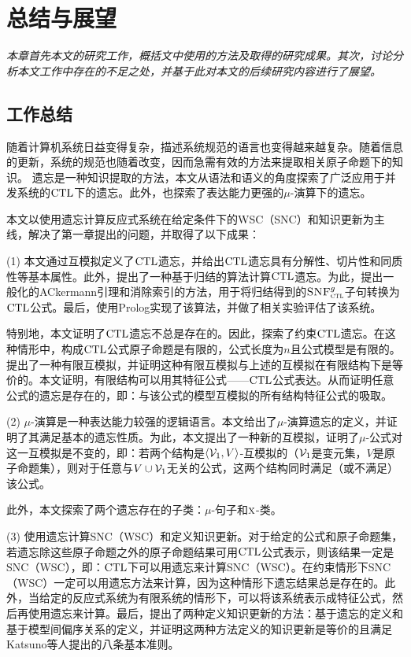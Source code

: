 \chapter{总结与展望}\label{chapter09}
{\em 本章首先本文的研究工作，概括文中使用的方法及取得的研究成果。其次，讨论分析本文工作中存在的不足之处，并基于此对本文的后续研究内容进行了展望。}

\section{工作总结}
随着计算机系统日益变得复杂，描述系统规范的语言也变得越来越复杂。随着信息的更新，系统的规范也随着改变，因而急需有效的方法来提取相关原子命题下的知识。
遗忘是一种知识提取的方法，本文从语法和语义的角度探索了广泛应用于并发系统的$\textrm{CTL}$下的遗忘。此外，也探索了表达能力更强的$\mu$-演算下的遗忘。

本文以使用遗忘计算反应式系统在给定条件下的WSC（SNC）和知识更新为主线，解决了第一章提出的问题，并取得了以下成果：

(1) 本文通过互模拟定义了$\textrm{CTL}$遗忘，并给出$\textrm{CTL}$遗忘具有分解性、切片性和同质性等基本属性。此外，提出了一种基于归结的算法计算$\textrm{CTL}$遗忘。为此，提出一般化的ACkermann引理和消除索引的方法，用于将归结得到的${\textsc{SNF}_{\textsc{ctl}}^g}$子句转换为$\textrm{CTL}$公式。最后，使用Prolog实现了该算法，并做了相关实验评估了该系统。

特别地，本文证明了$\textrm{CTL}$遗忘不总是存在的。因此，探索了约束$\textrm{CTL}$遗忘。在这种情形中，构成$\textrm{CTL}$公式原子命题是有限的，公式长度为$n$且公式模型是有限的。提出了一种有限互模拟，并证明这种有限互模拟与上述的互模拟在有限结构下是等价的。本文证明，有限结构可以用其特征公式——$\textrm{CTL}$公式表达。从而证明任意公式的遗忘是存在的，即：与该公式的模型互模拟的所有结构特征公式的吸取。

(2) $\mu$-演算是一种表达能力较强的逻辑语言。本文给出了$\mu$-演算遗忘的定义，并证明了其满足基本的遗忘性质。为此，本文提出了一种新的互模拟，证明了$\mu$-公式对这一互模拟是不变的，即：若两个结构是${\langle{{\cal V}_1, V}\rangle}$-互模拟的（${\cal V}_1$是变元集，$V$是原子命题集），则对于任意与$V\cup {\cal V}_1$无关的公式，这两个结构同时满足（或不满足）该公式。

此外，本文探索了两个遗忘存在的子类：$\mu$-句子和$\textsc{x}$-类。

(3) 使用遗忘计算SNC（WSC）和定义知识更新。对于给定的公式和原子命题集，若遗忘除这些原子命题之外的原子命题结果可用$\textrm{CTL}$公式表示，则该结果一定是SNC（WSC），即：$\textrm{CTL}$下可以用遗忘来计算SNC（WSC）。在约束情形下SNC（WSC）一定可以用遗忘方法来计算，因为这种情形下遗忘结果总是存在的。此外，当给定的反应式系统为有限系统的情形下，可以将该系统表示成特征公式，然后再使用遗忘来计算。最后，提出了两种定义知识更新的方法：基于遗忘的定义和基于模型间偏序关系的定义，并证明这两种方法定义的知识更新是等价的且满足Katsuno等人提出的八条基本准则。

